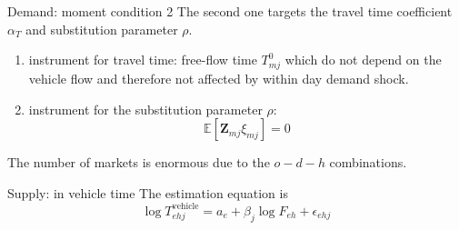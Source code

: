 \documentclass[10pt, aspectratio=169]{beamer}
\begin{document}
\begin{frame}{Demand: moment condition 2}
  The second one targets the travel time coefficient $\alpha_T$ and substitution parameter $\rho$.
  \begin{enumerate}
    \item instrument for travel time: free-flow time $T_{mj}^0$ which do not depend on
          the vehicle flow and therefore not affected by within day demand shock.
    \item instrument for the substitution parameter $\rho$: \citet{gandhi2019measuring}
          \begin{equation*}
            \mathbb{E} \left[ \mathbf{Z}_{mj} \xi_{mj} \right] = 0
          \end{equation*}
  \end{enumerate}
\end{frame}
\begin{frame}
  \begin{table}[htpb]\fontsize{6pt}{6pt}\selectfont
    \centering
    \caption{Demand estimation results}
    
  \end{table}
  The number of markets is enormous due to the $o-d-h$ combinations.
\end{frame}
\begin{frame}{Supply: in vehicle time}
  The estimation equation is
  \begin{equation*}
    \log T_{ehj}^{\text{vehicle}} = a_e + \beta_j \log F_{eh} + \epsilon_{ehj}
  \end{equation*}
\end{frame}
\begin{frame}
  \begin{table}[htpb]\fontsize{6pt}{6pt}\selectfont
    \centering
    \caption{Traffic congestion estimation results}
    
  \end{table}

\end{frame}
\end{document}

